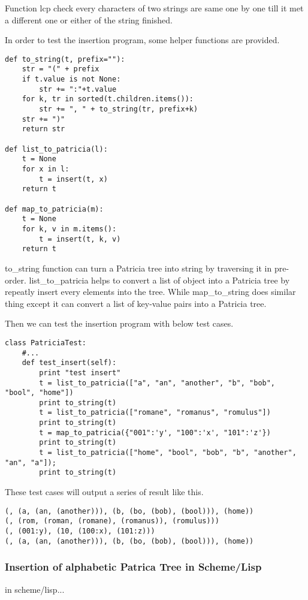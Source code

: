 \documentclass{article}
\begin{document}
Function lcp check every characters of two strings are same one by one 
till it met a different one or either of the string finished. 

In order to test the insertion program, some helper functions are
provided.

\begin{lstlisting}
def to_string(t, prefix=""):
    str = "(" + prefix
    if t.value is not None:
        str += ":"+t.value
    for k, tr in sorted(t.children.items()):
        str += ", " + to_string(tr, prefix+k)
    str += ")"
    return str

def list_to_patricia(l):
    t = None
    for x in l:
        t = insert(t, x)
    return t

def map_to_patricia(m):
    t = None
    for k, v in m.items():
        t = insert(t, k, v)
    return t
\end{lstlisting}

to\_string function can turn a Patricia tree into string by traversing it
in pre-order. list\_to\_patricia helps to convert a list of object into
a Patricia tree by repeatly insert every elements into the tree. While 
map\_to\_string does similar thing except it can convert a list of key-value
pairs into a Patricia tree.

Then we can test the insertion program with below test cases.

\begin{lstlisting}
class PatriciaTest:
    #...
    def test_insert(self):
        print "test insert"
        t = list_to_patricia(["a", "an", "another", "b", "bob", "bool", "home"])
        print to_string(t)
        t = list_to_patricia(["romane", "romanus", "romulus"])
        print to_string(t)
        t = map_to_patricia({"001":'y', "100":'x', "101":'z'})
        print to_string(t)
        t = list_to_patricia(["home", "bool", "bob", "b", "another", "an", "a"]);
        print to_string(t)
\end{lstlisting}

These test cases will output a series of result like this.

\begin{verbatim}
(, (a, (an, (another))), (b, (bo, (bob), (bool))), (home))
(, (rom, (roman, (romane), (romanus)), (romulus)))
(, (001:y), (10, (100:x), (101:z)))
(, (a, (an, (another))), (b, (bo, (bob), (bool))), (home))
\end{verbatim}

\subsubsection*{Insertion of alphabetic Patrica Tree in Scheme/Lisp}
in scheme/lisp...
\end{document}
